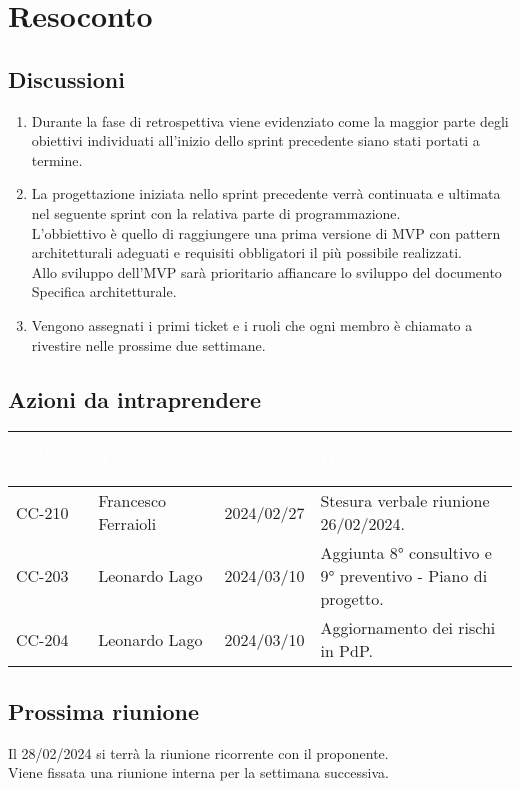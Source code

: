 \section{Resoconto} \label{sec:resoconto}
\subsection{Discussioni} \label{subsec:resdiscussione}
\begin{enumerate}
    \item Durante la fase di retrospettiva viene evidenziato come la maggior parte degli obiettivi individuati all'inizio dello sprint precedente siano stati portati a termine. 
    
    \item La progettazione iniziata nello sprint precedente verrà continuata e ultimata nel seguente sprint con la relativa parte di programmazione. \\
    L'obbiettivo è quello di raggiungere una prima versione di MVP con pattern architetturali adeguati e requisiti obbligatori il più possibile realizzati. \\
    Allo sviluppo dell'MVP sarà prioritario affiancare lo sviluppo del documento Specifica architetturale.
    
    \item Vengono assegnati i primi ticket e i ruoli che ogni membro è chiamato a rivestire nelle prossime due settimane.
\end{enumerate}

\subsection{Azioni da intraprendere}
{
    \setlength{\tabcolsep}{10pt}
            \renewcommand{\arraystretch}{1.5}
            \begin{xltabular}{\textwidth}{| l | l | l | X |}
                 \hline
                 \textbf{\textcolor{white}{Codice issue}} & \textbf{\textcolor{white}{Assegnatario}} & \textbf{\textcolor{white}{Scadenza}} & \textbf{\textcolor{white}{Descrizione}} \\
                 \hline
                 CC-210 & Francesco Ferraioli & 2024/02/27 & Stesura verbale riunione 26/02/2024.\\
                 \hline
                 CC-203 & Leonardo Lago & 2024/03/10 & Aggiunta 8° consultivo e 9° preventivo - Piano di progetto.\\
                 \hline
                 CC-204 & Leonardo Lago & 2024/03/10 & Aggiornamento dei rischi in PdP.\\
                 \hline
                 
            \end{xltabular}
}

\subsection{Prossima riunione} \label{subsec:riunione}
Il 28/02/2024 si terrà la riunione ricorrente con il proponente. \\ 
Viene fissata una riunione interna per la settimana successiva.